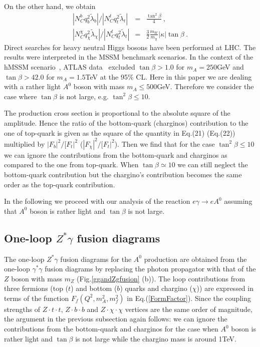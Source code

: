 \documentclass[final,5p,times,twocolumn]{elsarticle}
\newcommand{\bea}{\begin{eqnarray}}
\newcommand{\eea}{\end{eqnarray}}
\begin{document}
On the other hand, we obtain 
\bea
|N_C^bq_b^2{\widetilde \lambda}_b|/|N_C^tq_t^2{\widetilde \lambda}_t|
&=&\frac{\tan^2\beta}{4}~, \\
|N_C^\chi q_\chi^2{\widetilde \lambda}_\chi|/|N_C^tq_t^2{\widetilde \lambda}_t|
&=&\frac{3}{2}\frac{m_W}{m_\chi}|\kappa| \tan\beta~. 
\eea 
Direct searches for heavy neutral Higgs bosons have been performed at  LHC. The results were  interpreted in the MSSM benchmark scenarios. In the context of the hMSSM 
scenario~\cite{hMSSM}, ATLAS data~\cite{ATLAStanbeta} excluded $\tan\beta>1.0$ for $m_A=250$GeV and $\tan\beta>42.0$ for $m_A=1.5$TeV at the 95\% CL.
Here in this paper we are dealing with a rather light $A^0$ boson with mass $m_A\le 500$GeV. Therefore we consider the case where $\tan\beta$ is not large, e.g. $\tan^2\beta \leq 10$.


The production cross section is proportional to the absolute square of the amplitude.
Hence the ratio of the bottom-quark (charginos) contribution to the 
one of top-quark is given as the square of the quantity in Eq.(21) (Eq.(22)) 
multiplied by $|F_b|^2/[F_t|^2$ ($|F_\chi|^2/[F_t|^2$).
Then we find that for the case $\tan^2\beta \leq 10$ we can ignore the contributions from
the bottom-quark and charginos as compared to the one from top-quark. When $\tan\beta \simeq 10$ we can still
neglect the bottom-quark contribution but the chargino's contribution 
becomes the same order as the top-quark contribution.

In the following we proceed with our analysis of the reaction $e\gamma\rightarrow eA^0$ 
assuming that  $A^0$ boson is rather light and $\tan\beta$ is not large. 

\subsection{One-loop $Z^*\gamma$ fusion diagrams}

The one-loop $Z^*\gamma$ fusion diagrams for the $A^0$ production are obtained from the one-loop 
$\gamma^*\gamma$ fusion diagrams by replacing the photon propagator with that of the $Z$ boson with mass $m_Z$ (Fig.\ref{ggandZgfusion} (b)).  
The loop contributions from three fermions (top ($t$) and bottom ($b$) quarks and chargino ($\chi$)) are expressed in terms of the function $F_f(Q^2,m_A^2, m_f^2)$ in Eq.(\ref{FormFactor}). Since the coupling strengths of $Z\cdot t\cdot t$, $Z\cdot b\cdot b$ and $Z\cdot \chi\cdot \chi$ vertices are the same order of magnitude, the argument in the previous subsection again follows: 
we can ignore the contributions from the bottom-quark and charginos for the case when $A^0$ boson is rather light and $\tan\beta$ is not large while the chargino mass is around 1TeV.
\end{document}
